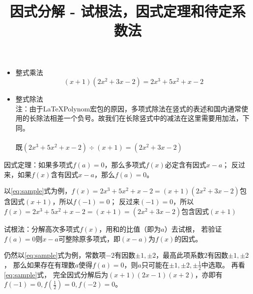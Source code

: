 \documentclass[windows,csize4]{BHCexam}
\title{因式分解 - 试根法，因式定理和待定系数法}
\begin{document}
\maketitle

\begin{groups}
    \begin{itemize}
        \item 整式乘法
              \begin{equation}
                  \label{eq:sample}
                  (x+1)(2x^2+3x-2) = 2x^3+5x^2+x-2
              \end{equation}
        \item 整式除法 \\
              注：由于\LaTeX \quad Polynom宏包的原因，多项式除法在竖式的表述和国内通常使用的长除法相差一个负号。故我们在长除竖式中的减法在这里需要用加法，下同。\\
               \\
              既$(2x^3+5x^2+x-2)\div (x+1)=(2x^2+3x-2)$
    \end{itemize}

    \fbox
    {
        \parbox{\textwidth}
        {
            因式定理：如果多项式$f(a)=0$，那么多项式$f(x)$必定含有因式$x-a$；
            反过来，如果$f(x)$含有因式$x-a$，那么$f(a)=0$。
        }
    }
    以\ref{eq:sample}式为例，$f(x)=2x^3+5x^2+x-2=(x+1)(2x^2+3x-2)$包含因式$(x+1)$，所以$f(-1)=0$；
    反过来$(-1)=0$，所以$f(x)=2x^3+5x^2+x-2=(x+1)=(2x^2+3x-2)$包含因式$(x+1)$

    \fbox
    {
        \parbox{\textwidth}
        {
            试根法：分解高次多项式$f(x)$，用和的比值（即为$a$）去试根，
            若验证$f(a)=0$则$x-a$可整除原多项式，即$(x-a)$为$f(x)$的因式。
        }
    }
    仍然以\ref{eq:sample}式为例，常数项$-2$有因数$\pm 1,\pm 2$，最高此项系数$2$有因数$\pm 1,\pm 2$，
    那么如果存在有理数$a$使得$f(a)=0$，则$a$只可能在$\pm 1, \pm 2, \pm\frac{1}{2}$中选取。
    再看\ref{eq:sample}式， 完全因式分解后为$(x+1)(2x-1)(x+2)$，亦即有$f(-1)=0,f(\frac{1}{2})=0,f(-2)=0$。


\end{groups}
\end{document}
